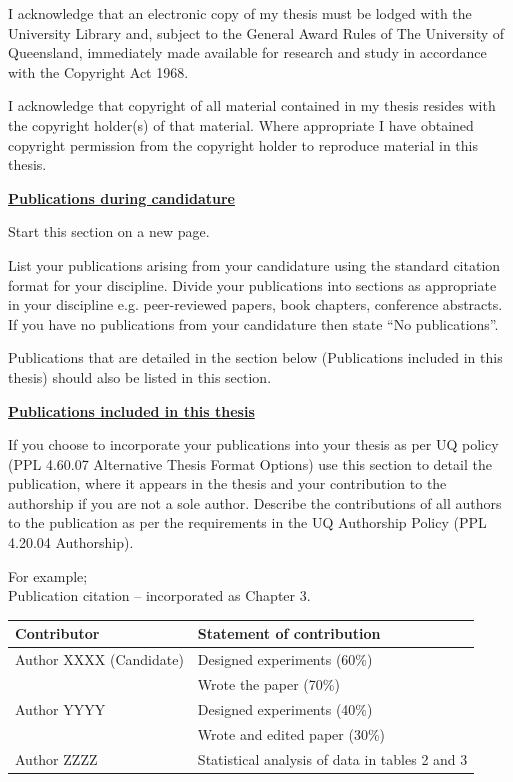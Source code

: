I acknowledge that an electronic copy of my thesis must be lodged with the
University Library and, subject to the General Award Rules of The University of
Queensland, immediately made available for research and study in accordance
with the Copyright Act 1968.

I acknowledge that copyright of all material contained in my thesis resides
with the copyright holder(s) of that material. Where appropriate I have
obtained copyright permission from the copyright holder to reproduce material
in this thesis.

\newpage
{\bf \underline{Publications during candidature}}

Start this section on a new page.

List your publications arising from your candidature using the standard
citation format for your discipline. Divide your publications into sections as
appropriate in your discipline e.g. peer-reviewed papers, book chapters,
conference abstracts. If you have no publications from your candidature then
state ``No publications''.

Publications that are detailed in the section below (Publications included in
this thesis) should also be listed in this section.


{\bf \underline{Publications included in this thesis}}

If you choose to incorporate your publications into your thesis as per UQ
policy (PPL 4.60.07 Alternative Thesis Format Options) use this section to
detail the publication, where it appears in the thesis and your contribution to
the authorship if you are not a sole author. Describe the contributions of all
authors to the publication as per the requirements in the UQ Authorship Policy
(PPL 4.20.04 Authorship).

For example;\\
Publication citation – incorporated as Chapter 3.

\begin{tabular}{|l|l|}
  \hline
  Contributor & Statement of contribution \\ \hline
  Author XXXX (Candidate) & Designed experiments (60\%) \\
                          & Wrote the paper (70\%) \\
\hline
  Author YYYY & Designed experiments (40\%) \\
                          & Wrote and edited paper (30\%) \\
\hline
  Author ZZZZ & Statistical analysis of data in tables 2 and 3 \\
\hline
\end{tabular}

